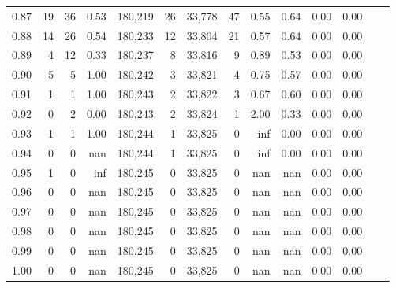 \begin{tabular}{rrrrrrrrrrrrrr}
0.87 &     19 &   36 &    0.53 &  180,219 &       26 &  33,778 &      47 &  0.55 &  0.64 &  0.00 &      0.00 \\
0.88 &     14 &   26 &    0.54 &  180,233 &       12 &  33,804 &      21 &  0.57 &  0.64 &  0.00 &      0.00 \\
0.89 &      4 &   12 &    0.33 &  180,237 &        8 &  33,816 &       9 &  0.89 &  0.53 &  0.00 &      0.00 \\
0.90 &      5 &    5 &    1.00 &  180,242 &        3 &  33,821 &       4 &  0.75 &  0.57 &  0.00 &      0.00 \\
0.91 &      1 &    1 &    1.00 &  180,243 &        2 &  33,822 &       3 &  0.67 &  0.60 &  0.00 &      0.00 \\
0.92 &      0 &    2 &    0.00 &  180,243 &        2 &  33,824 &       1 &  2.00 &  0.33 &  0.00 &      0.00 \\
0.93 &      1 &    1 &    1.00 &  180,244 &        1 &  33,825 &       0 &   inf &  0.00 &  0.00 &      0.00 \\
0.94 &      0 &    0 &     nan &  180,244 &        1 &  33,825 &       0 &   inf &  0.00 &  0.00 &      0.00 \\
0.95 &      1 &    0 &     inf &  180,245 &        0 &  33,825 &       0 &   nan &   nan &  0.00 &      0.00 \\
0.96 &      0 &    0 &     nan &  180,245 &        0 &  33,825 &       0 &   nan &   nan &  0.00 &      0.00 \\
0.97 &      0 &    0 &     nan &  180,245 &        0 &  33,825 &       0 &   nan &   nan &  0.00 &      0.00 \\
0.98 &      0 &    0 &     nan &  180,245 &        0 &  33,825 &       0 &   nan &   nan &  0.00 &      0.00 \\
0.99 &      0 &    0 &     nan &  180,245 &        0 &  33,825 &       0 &   nan &   nan &  0.00 &      0.00 \\
1.00 &      0 &    0 &     nan &  180,245 &        0 &  33,825 &       0 &   nan &   nan &  0.00 &      0.00 \\
\bottomrule
\end{tabular}
